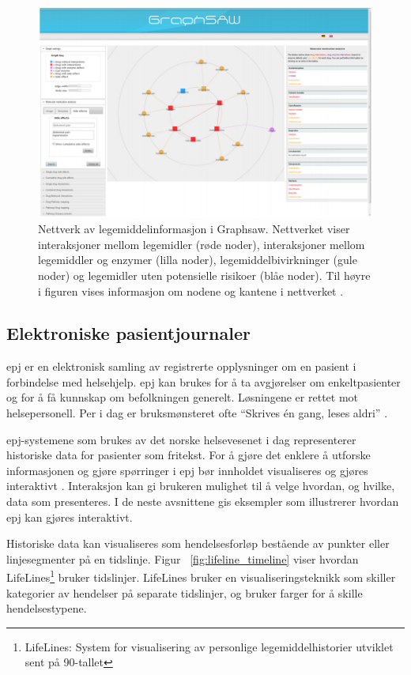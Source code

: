 \begin{figure}[H]
  \centering
    \includegraphics[width=1\textwidth]{fig/litteratursok/graphsaw.PNG}
  \caption{Nettverk av legemiddelinformasjon i Graphsaw. Nettverket viser interaksjoner mellom legemidler (røde noder), interaksjoner mellom legemiddler og enzymer (lilla noder), legemiddelbivirkninger (gule noder) og legemidler uten potensielle risikoer (blåe noder). Til høyre i figuren vises informasjon om nodene og kantene i nettverket \citep{shoshi2015graphsaw}.}
\label{fig:graphsaw}
\end{figure}

\subsection{Elektroniske pasientjournaler}
\acrfull{epj} er en elektronisk samling av registrerte opplysninger om en pasient i forbindelse med helsehjelp. \acrfull{epj} kan brukes for å ta avgjørelser om enkeltpasienter og for å få kunnskap om befolkningen generelt. Løsningene er rettet mot helsepersonell. Per i dag er bruksmønsteret ofte “Skrives én gang, leses aldri” \citep{powsner1994graphical}.  

\acrshort{epj}-systemene som brukes av det norske helsevesenet i dag representerer historiske data for pasienter som fritekst. For å gjøre det enklere å utforske informasjonen og gjøre spørringer i \acrshort{epj} bør innholdet visualiseres og gjøres interaktivt \citep{spense2007information}. Interaksjon kan gi brukeren mulighet til å velge hvordan, og hvilke, data som presenteres. I de neste avsnittene gis eksempler som illustrerer hvordan \acrshort{epj} kan gjøres interaktivt. 

Historiske data kan visualiseres som hendelsesforløp bestående av punkter eller linjesegmenter på en tidslinje. Figur ~\ref{fig:lifeline_timeline} viser hvordan LifeLines\footnote{LifeLines: System for visualisering av personlige legemiddelhistorier utviklet sent på 90-tallet} bruker tidslinjer. LifeLines bruker en visualiseringsteknikk som skiller kategorier av hendelser på separate tidslinjer, og bruker farger for å skille hendelsestypene. 

